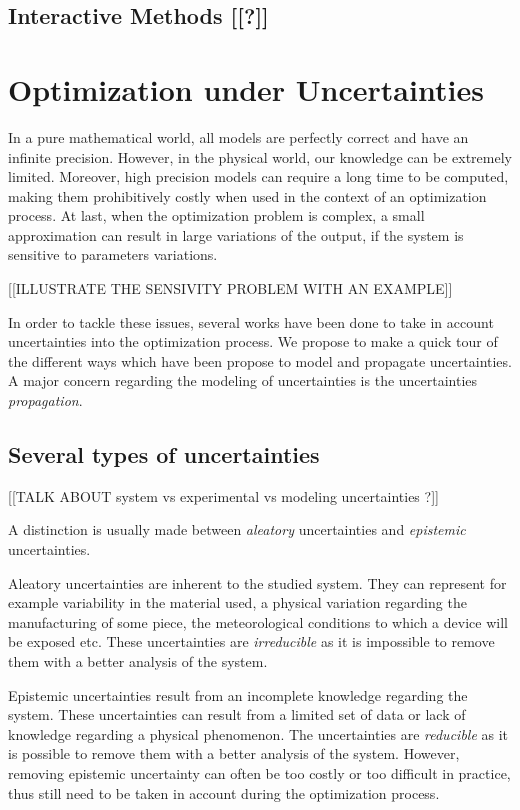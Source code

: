 \section{Interactive Methods [[?]]}

\chapter{Optimization under Uncertainties}

In a pure mathematical world, all models are perfectly correct and have an infinite precision. However, in the physical world, our knowledge can be extremely limited. Moreover, high precision models can require a long time to be computed, making them prohibitively costly when used in the context of an optimization process. At last, when the optimization problem is complex, a small approximation can result in large variations of the output, if the system is sensitive to parameters variations.

[[ILLUSTRATE THE SENSIVITY PROBLEM WITH AN EXAMPLE]]

In order to tackle these issues, several works have been done to take in account uncertainties into the optimization process. We propose to make a quick tour of the different ways which have been propose to model and propagate uncertainties.
A major concern regarding the modeling of uncertainties is the uncertainties \emph{propagation}. 

\section{Several types of uncertainties}

[[TALK ABOUT system vs experimental vs modeling uncertainties ?]]

A distinction is usually made between \emph{aleatory} uncertainties and \emph{epistemic} uncertainties.

Aleatory uncertainties are inherent to the studied system. They can represent for example variability in the material used, a physical variation regarding the manufacturing of some piece, the meteorological conditions to which a device will be exposed etc.
These uncertainties are \emph{irreducible} as it is impossible to remove them with a better analysis of the system.

Epistemic uncertainties result from an incomplete knowledge regarding the system. These uncertainties can result from a limited set of data or lack of knowledge regarding a physical phenomenon.
The uncertainties are \emph{reducible} as it is possible to remove them with a better analysis of the system. However, removing epistemic uncertainty can often be too costly or too difficult in practice, thus still need to be taken in account during the optimization process.

